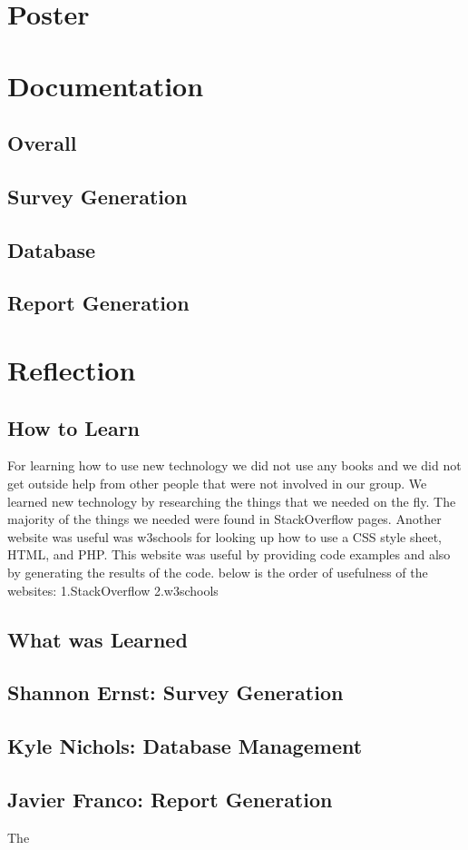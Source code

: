 \documentclass[letterpaper,10pt,serif,draftclsnofoot,onecolumn,compsoc,titlepage]{IEEEtran}
\begin{document}
\section{Poster}
\section{Documentation}
\subsection{Overall}
\subsection{Survey Generation}
\subsection{Database}
\subsection{Report Generation}
\section{Reflection}
\subsection{How to Learn}
For learning how to use new technology we did not use any books and we did not get outside help from other people that were not involved in our group. We learned new technology by researching the things that we needed on the fly. The majority of the things we needed were found in StackOverflow pages. Another website was useful was w3schools for looking up how to use a CSS style sheet, HTML, and PHP. This website was useful by providing code examples and also by generating the results of the code. below is the order of usefulness of the websites:
1.StackOverflow
2.w3schools
\subsection{What was Learned}
\subsection{Shannon Ernst: Survey Generation}
\subsection{Kyle Nichols: Database Management}
\subsection{Javier Franco: Report Generation}
The 

%
%
\end{document}
